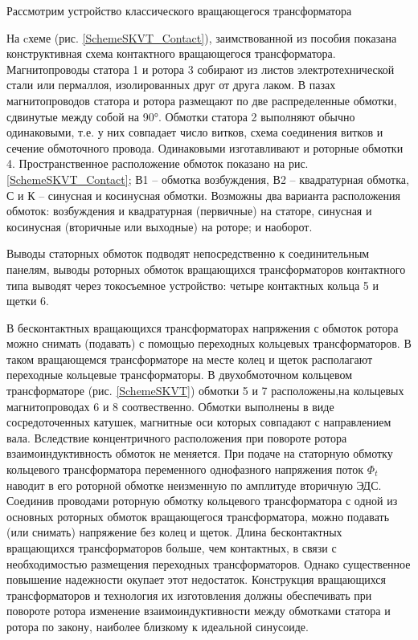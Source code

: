 Рассмотрим устройство классического вращающегося трансформатора

На cхеме (рис. \ref{SchemeSKVT_Contact}), заимствованной из пособия \cite{AutoDevices} показана конструктивная схема контактного вращающегося трансформатора. 
Магнитопроводы статора 1 и ротора 3 собирают из листов электротехнической стали или пермаллоя, 
изолированных друг от друга лаком. В пазах магнитопроводов статора и ротора размещают по две распределенные обмотки, сдвинутые между собой на 90°. 
Обмотки статора 2 выполняют обычно одинаковыми, т.е. у них совпадает число витков, схема соединения витков и сечение обмоточного провода. 
Одинаковыми изготавливают и роторные обмотки 4. Пространственное расположение обмоток показано на рис. \ref{SchemeSKVT_Contact}; В1 – обмотка возбуждения, В2 – квадратурная обмотка, 
С и К – синусная и косинусная обмотки. Возможны два варианта расположения обмоток: возбуждения и квадратурная (первичные) на статоре, 
синусная и косинусная (вторичные или выходные) на роторе; и наоборот. 

Выводы статорных обмоток подводят непосредственно к соединительным панелям, выводы роторных обмоток вращающихся трансформаторов контактного типа 
выводят через токосъемное устройство: четыре контактных кольца 5 и щетки 6.

В бесконтактных вращающихся трансформаторах напряжения с обмоток ротора можно снимать (подавать) с помощью переходных кольцевых трансформаторов.
В таком вращающемся трансформаторе на месте колец и щеток располагают переходные кольцевые трансформаторы. 
В двухобмоточном кольцевом трансформаторе (рис. \ref{SchemeSKVT}) обмотки 5 и 7 расположены,на кольцевых магнитопроводах 6 и 8 соотвественно.    
Обмотки выполнены в виде сосредоточенных катушек, магнитные оси которых совпадают с направлением вала. Вследствие концентричного расположения при повороте ротора взаимоиндуктивность 
обмоток не меняется. При подаче на статорную обмотку кольцевого трансформатора переменного однофазного напряжения поток $ \Phi_t $ наводит в его роторной обмотке неизменную по амплитуде вторичную ЭДС. 
Соединив проводами роторную обмотку кольцевого трансформатора с одной из основных роторных обмоток вращающегося трансформатора, можно подавать (или снимать) напряжение без колец и щеток. 
Длина бесконтактных вращающихся трансформаторов больше, чем контактных, в связи с необходимостью размещения переходных трансформаторов. Однако существенное повышение надежности 
окупает этот недостаток. Конструкция вращающихся трансформаторов и технология их изготовления должны обеспечивать при повороте ротора изменение взаимоиндуктивности между обмотками статора и ротора по закону, 
наиболее близкому к идеальной синусоиде.



